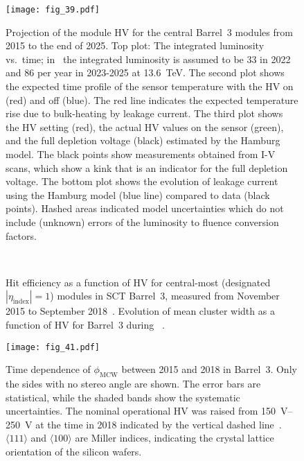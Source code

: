 \documentclass[cernpreprint, atlasdraft=false, UKenglish,british,orcidlogo, texmf, orcidlogo]{atlasdoc}
\begin{document}
\begin{figure}[p]
\begin{center}
\texttt{[image: fig\_39.pdf]}
\caption{Projection of the module \gls{HV} for the central Barrel~3 modules from 2015 to the end of 2025. Top plot: The integrated luminosity vs.\ time; in \RunThr\ the integrated luminosity is assumed to be \SI{33}{\ifb} in 2022 and \SI{86}{\ifb} per year in 2023-2025 at \SI{13.6}{\TeV}.
The second plot shows the expected time profile of the sensor temperature with the \gls{HV} on (red) and off (blue). The red line indicates the expected temperature rise due to bulk-heating by leakage current. The third plot shows the \gls{HV} setting (red), the actual \gls{HV} values on the sensor (green), and the full depletion voltage (black) estimated by the Hamburg model. The black points show measurements obtained from I-V scans, which show a kink that is an indicator for the full depletion voltage. The bottom plot shows the evolution of leakage current using the Hamburg model (blue line) compared to data (black points). Hashed areas indicated model uncertainties which do not include (unknown) errors of the luminosity to fluence conversion factors.}
\label{SCT001}
\end{center}
\end{figure}
 
 
\begin{figure}[htbp]
\centering
{}
\\
 
\caption{\protect{} Hit efficiency as a function of \gls{HV} for central-most (designated $|\eta_\text{index}|=1$) modules in \gls{SCT} Barrel~3, measured from November 2015 to September 2018~\cite{SCTD-2019-01}. \protect{} Evolution of mean cluster width as a function of \gls{HV} for Barrel~3 during \RunTwo~\cite{SCTD-2019-01}. }
\end{figure}
 
 
 
\begin{figure}[htbp]
\begin{center}
 
\texttt{[image: fig\_41.pdf]}
 
\caption{Time dependence of $\phi_\text{MCW}$ between 2015 and 2018 in Barrel~3. Only the sides with no stereo angle are shown. The error bars are statistical, while the shaded bands show the systematic uncertainties. The nominal operational \gls{HV} was raised from \SIrange{150}{250}{\volt} at the time in 2018 indicated by the vertical dashed line~\cite{SCTD-2019-01}. $\langle111\rangle$ and $\langle100\rangle$ are Miller indices, indicating the crystal lattice orientation of the silicon wafers.
}
\label{SCT004}
\end{center}
\end{figure}
 
\end{document}
